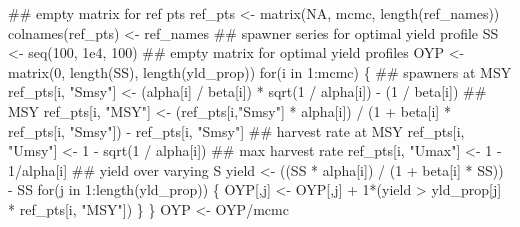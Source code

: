 \documentclass[11pt,]{article}
\newenvironment{Shaded}{}{}
\newcommand{\CommentTok}[1]{\textcolor[rgb]{0.00,0.50,0.00}{#1}}
\newcommand{\ControlFlowTok}[1]{\textcolor[rgb]{0.00,0.00,1.00}{#1}}
\newcommand{\DecValTok}[1]{#1}
\newcommand{\FloatTok}[1]{#1}
\newcommand{\KeywordTok}[1]{\textcolor[rgb]{0.00,0.00,1.00}{#1}}
\newcommand{\NormalTok}[1]{#1}
\newcommand{\OperatorTok}[1]{#1}
\newcommand{\OtherTok}[1]{\textcolor[rgb]{1.00,0.25,0.00}{#1}}
\newcommand{\StringTok}[1]{\textcolor[rgb]{0.00,0.50,0.50}{#1}}
\begin{document}
\begin{Shaded}
\begin{Highlighting}[]
\CommentTok{## empty matrix for ref pts}
\NormalTok{ref_pts <-}\StringTok{ }\KeywordTok{matrix}\NormalTok{(}\OtherTok{NA}\NormalTok{, mcmc, }\KeywordTok{length}\NormalTok{(ref_names))}
\KeywordTok{colnames}\NormalTok{(ref_pts) <-}\StringTok{ }\NormalTok{ref_names}
\CommentTok{## spawner series for optimal yield profile}
\NormalTok{SS <-}\StringTok{ }\KeywordTok{seq}\NormalTok{(}\DecValTok{100}\NormalTok{, }\FloatTok{1e4}\NormalTok{, }\DecValTok{100}\NormalTok{)}
\CommentTok{## empty matrix for optimal yield profiles}
\NormalTok{OYP <-}\StringTok{ }\KeywordTok{matrix}\NormalTok{(}\DecValTok{0}\NormalTok{, }\KeywordTok{length}\NormalTok{(SS), }\KeywordTok{length}\NormalTok{(yld_prop))}
\ControlFlowTok{for}\NormalTok{(i }\ControlFlowTok{in} \DecValTok{1}\OperatorTok{:}\NormalTok{mcmc) \{}
    \CommentTok{## spawners at MSY}
\NormalTok{    ref_pts[i, }\StringTok{"Smsy"}\NormalTok{] <-}\StringTok{ }\NormalTok{(alpha[i] }\OperatorTok{/}\StringTok{ }\NormalTok{beta[i]) }\OperatorTok{*}\StringTok{ }\KeywordTok{sqrt}\NormalTok{(}\DecValTok{1} \OperatorTok{/}\StringTok{ }\NormalTok{alpha[i]) }\OperatorTok{-}\StringTok{ }\NormalTok{(}\DecValTok{1} \OperatorTok{/}\StringTok{ }\NormalTok{beta[i])}
    \CommentTok{## MSY}
\NormalTok{    ref_pts[i, }\StringTok{"MSY"}\NormalTok{] <-}\StringTok{ }\NormalTok{(ref_pts[i,}\StringTok{"Smsy"}\NormalTok{] }\OperatorTok{*}\StringTok{ }\NormalTok{alpha[i]) }\OperatorTok{/}
\StringTok{                            }\NormalTok{(}\DecValTok{1} \OperatorTok{+}\StringTok{ }\NormalTok{beta[i] }\OperatorTok{*}\StringTok{ }\NormalTok{ref_pts[i, }\StringTok{"Smsy"}\NormalTok{]) }\OperatorTok{-}\StringTok{ }\NormalTok{ref_pts[i, }\StringTok{"Smsy"}\NormalTok{]}
    \CommentTok{## harvest rate at MSY}
\NormalTok{    ref_pts[i, }\StringTok{"Umsy"}\NormalTok{] <-}\StringTok{ }\DecValTok{1} \OperatorTok{-}\StringTok{ }\KeywordTok{sqrt}\NormalTok{(}\DecValTok{1} \OperatorTok{/}\StringTok{ }\NormalTok{alpha[i])}
    \CommentTok{## max harvest rate}
\NormalTok{    ref_pts[i, }\StringTok{"Umax"}\NormalTok{] <-}\StringTok{ }\DecValTok{1} \OperatorTok{-}\StringTok{ }\DecValTok{1}\OperatorTok{/}\NormalTok{alpha[i]}
    \CommentTok{## yield over varying S}
\NormalTok{    yield <-}\StringTok{ }\NormalTok{((SS }\OperatorTok{*}\StringTok{ }\NormalTok{alpha[i]) }\OperatorTok{/}\StringTok{ }\NormalTok{(}\DecValTok{1} \OperatorTok{+}\StringTok{ }\NormalTok{beta[i] }\OperatorTok{*}\StringTok{ }\NormalTok{SS)) }\OperatorTok{-}\StringTok{ }\NormalTok{SS}
    \ControlFlowTok{for}\NormalTok{(j }\ControlFlowTok{in} \DecValTok{1}\OperatorTok{:}\KeywordTok{length}\NormalTok{(yld_prop)) \{}
\NormalTok{        OYP[,j] <-}\StringTok{ }\NormalTok{OYP[,j] }\OperatorTok{+}\StringTok{ }\DecValTok{1}\OperatorTok{*}\NormalTok{(yield }\OperatorTok{>}\StringTok{ }\NormalTok{yld_prop[j] }\OperatorTok{*}\StringTok{ }\NormalTok{ref_pts[i, }\StringTok{"MSY"}\NormalTok{])}
\NormalTok{    \}}
\NormalTok{\}}
\NormalTok{OYP <-}\StringTok{ }\NormalTok{OYP}\OperatorTok{/}\NormalTok{mcmc}


\end{Highlighting}
\end{Shaded}
\end{document}
